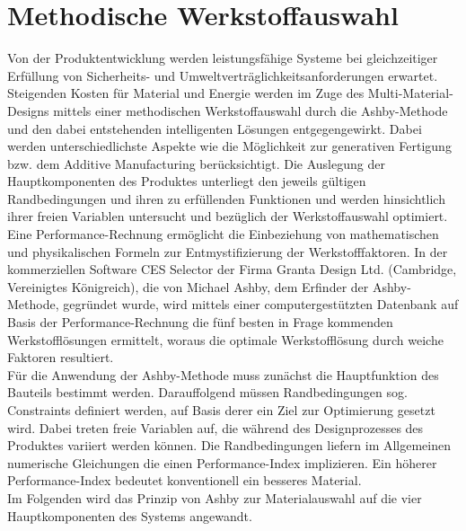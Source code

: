 
\chapter{Methodische Werkstoffauswahl}
Von der Produktentwicklung werden leistungsfähige Systeme bei gleichzeitiger Erfüllung von Sicherheits- und Umweltverträglichkeitsanforderungen erwartet. Steigenden Kosten für Material und Energie werden im Zuge des Multi-Material-Designs mittels einer methodischen Werkstoffauswahl durch die \glqq Ashby-Methode\glqq{} und den dabei entstehenden intelligenten Lösungen entgegengewirkt. Dabei werden unterschiedlichste Aspekte wie die Möglichkeit zur generativen Fertigung bzw. dem Additive Manufacturing berücksichtigt. Die Auslegung der Hauptkomponenten des Produktes unterliegt den jeweils gültigen Randbedingungen und ihren zu erfüllenden Funktionen und werden hinsichtlich ihrer freien Variablen untersucht und bezüglich der Werkstoffauswahl optimiert. Eine \glqq Performance-Rechnung\grqq{} ermöglicht die Einbeziehung von mathematischen und physikalischen Formeln zur Entmystifizierung der Werkstofffaktoren. In der kommerziellen Software CES Selector der Firma Granta Design Ltd. (Cambridge, Vereinigtes Königreich), die von Michael Ashby, dem Erfinder der Ashby-Methode, gegründet wurde, wird mittels einer computergestützten Datenbank auf Basis der Performance-Rechnung die fünf besten in Frage kommenden Werkstofflösungen ermittelt, woraus die optimale Werkstofflösung durch \glqq weiche\grqq{} Faktoren resultiert.\\
Für die Anwendung der Ashby-Methode muss zunächst die Hauptfunktion des Bauteils bestimmt werden. Darauffolgend müssen Randbedingungen sog. Constraints definiert werden, auf Basis derer ein Ziel zur Optimierung gesetzt wird. Dabei treten freie Variablen auf, die während des Designprozesses des Produktes variiert werden können. Die Randbedingungen liefern im Allgemeinen numerische Gleichungen die einen Performance-Index implizieren. Ein höherer Performance-Index bedeutet konventionell ein besseres Material.\\
Im Folgenden wird das Prinzip von Ashby zur Materialauswahl auf die vier Hauptkomponenten des Systems angewandt.

